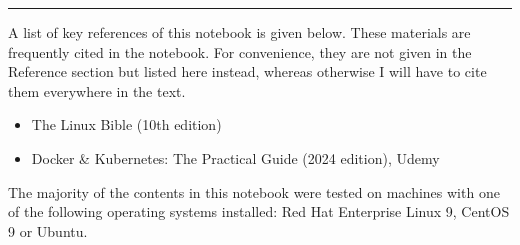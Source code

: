 \vspace{0.1in}
\noindent \rule{1in}{0.4pt}
\vspace{0.1in}

A list of key references of this notebook is given below. These materials are frequently cited in the notebook. For convenience, they are not given in the Reference section but listed here instead, whereas otherwise I will have to cite them everywhere in the text.

\begin{itemize}
	\item The Linux Bible (10th edition)
	\item Docker \& Kubernetes: The Practical Guide (2024 edition), Udemy
\end{itemize}
 
The majority of the contents in this notebook were tested on machines with one of the following operating systems installed: Red Hat Enterprise Linux 9, CentOS 9 or Ubuntu. 